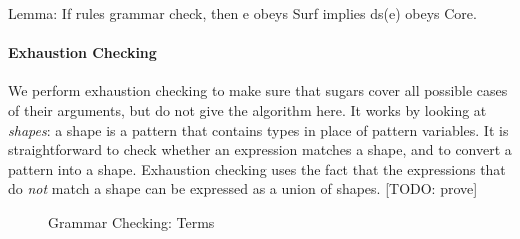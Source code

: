 Lemma: If rules grammar check, then e obeys Surf implies ds(e) obeys
Core.

\paragraph{Exhaustion Checking}
We perform exhaustion checking to make sure that sugars cover all
possible cases of their arguments, but do not give the algorithm here.
It works by looking at \emph{shapes}: a shape is a pattern that
contains types in place of pattern variables. It is straightforward to
check whether an expression matches a shape, and to convert a pattern
into a shape. Exhaustion checking uses the fact that the expressions
that do \emph{not} match a shape can be expressed as a union of shapes.
[TODO: prove]

\begin{figure}


\begin{multicols}{2}
  





\end{multicols}
\caption{Grammar Checking: Terms}
\end{figure}


